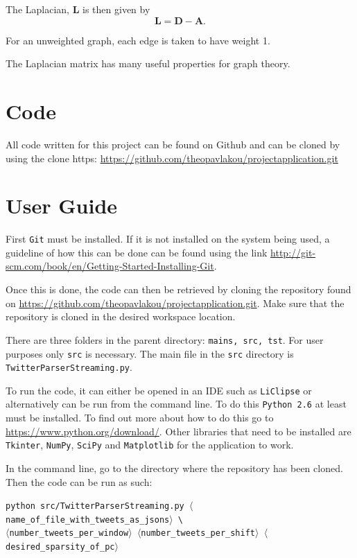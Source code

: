 \documentclass[11pt,a4paper]{article}
\begin{document}
The Laplacian, $\mathbf{L}$ is then given by
\begin{equation*}
\mathbf{L} = \mathbf{D} - \mathbf{A}.
\end{equation*}

For an unweighted graph, each edge is taken to have weight 1.

The Laplacian matrix has many useful properties for graph theory.
\section{Code}
All code written for this project can be found on Github and can be cloned by using the clone https:
\url{https://github.com/theopavlakou/projectapplication.git}


\section{User Guide}
First \texttt{Git} must be installed. If it is not installed on the system being used, a guideline of how this can be done can be found using the link \url{http://git-scm.com/book/en/Getting-Started-Installing-Git}.

Once this is done, the code can then be retrieved by cloning the repository found on \url{https://github.com/theopavlakou/projectapplication.git}. Make sure that the repository is cloned in the desired workspace location.

There are three folders in the parent directory: \texttt{mains, src, tst}. For user purposes only \texttt{src} is necessary. The main file in the \texttt{src} directory is \texttt{TwitterParserStreaming.py}.

To run the code, it can either be opened in an IDE such as \texttt{LiClipse} or alternatively can be run from the command line. To do this \texttt{Python 2.6} at least must be installed. To find out more about how to do this go to \url{https://www.python.org/download/}. Other libraries that need to be installed are \texttt{Tkinter}, \texttt{NumPy}, \texttt{SciPy} and \texttt{Matplotlib} for the application to work.

In the command line, go to the directory where the repository has been cloned. Then the code can be run as such:

\begin{framed}
\texttt{\footnotesize python src/TwitterParserStreaming.py $\langle$name\_of\_file\_with\_tweets\_as\_jsons$\rangle$ \textbackslash \\ $\langle$number\_tweets\_per\_window$\rangle$ $\langle$number\_tweets\_per\_shift$\rangle$  $\langle$desired\_sparsity\_of\_pc$\rangle$}
\end{framed}
\end{document}

